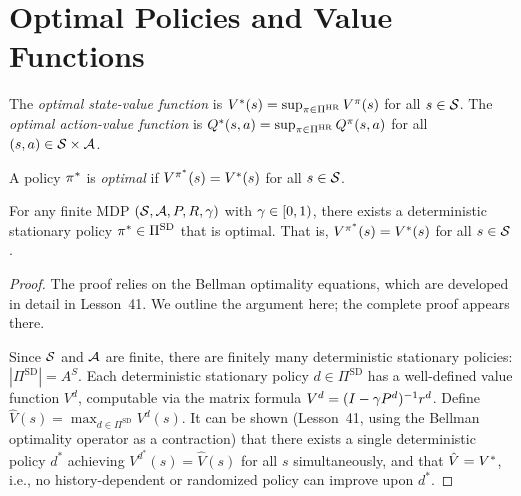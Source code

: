 \documentclass[11pt,a4paper]{article}
\begin{document}

\section{Optimal Policies and Value Functions}
\label{sec:optimal}

\begin{definition}
\label{def:optimal-value}
The \emph{optimal state-value function} is
$V^*(s) = \sup_{\pi \in \Pi^{\mathrm{HR}}} V^{\pi}(s)$ for all
$s \in \mathcal{S}$. The \emph{optimal action-value function} is
$Q^*(s,a) = \sup_{\pi \in \Pi^{\mathrm{HR}}} Q^{\pi}(s,a)$ for
all $(s,a) \in \mathcal{S} \times \mathcal{A}$.
\end{definition}

\begin{definition}
\label{def:optimal-policy}
A policy $\pi^*$ is \emph{optimal} if
$V^{\pi^*}(s) = V^*(s)$ for all $s \in \mathcal{S}$.
\end{definition}

\begin{theorem}
\label{thm:det-optimal}
For any finite MDP $(\mathcal{S}, \mathcal{A}, P, R, \gamma)$ with
$\gamma \in [0,1)$, there exists a deterministic stationary policy
$\pi^* \in \Pi^{\mathrm{SD}}$ that is optimal. That is,
$V^{\pi^*}(s) = V^*(s)$ for all $s \in \mathcal{S}$.
\end{theorem}

\begin{proof}
The proof relies on the Bellman optimality equations, which are
developed in detail in Lesson~41. We outline the argument here;
the complete proof appears there.

Since $\mathcal{S}$ and $\mathcal{A}$ are finite, there are finitely many
deterministic stationary policies: $|\Pi^{\mathrm{SD}}| = A^S$.
Each deterministic stationary policy $d \in \Pi^{\mathrm{SD}}$ has a
well-defined value function $V^d$, computable via the matrix formula
$V^d = (I - \gamma P^d)^{-1} r^d$. Define
$\hat{V}(s) = \max_{d \in \Pi^{\mathrm{SD}}} V^d(s)$. It can be
shown (Lesson~41, using the Bellman optimality operator as a
contraction) that there exists a single deterministic policy
$d^*$ achieving $V^{d^*}(s) = \hat{V}(s)$ for all $s$
simultaneously, and that $\hat{V} = V^*$, i.e., no
history-dependent or randomized policy can improve upon $d^*$.
\end{proof}
\end{document}

